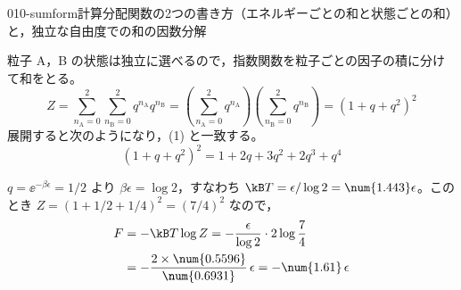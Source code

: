 \documentclass[uplatex,dvipdfmx,a4paper,11pt]{jsarticle}
\begin{document}
\begin{mondai}{010-sumform}{計算}{分配関数の2つの書き方（エネルギーごとの和と状態ごとの和）と，独立な自由度での和の因数分解}
\begin{tadashii}
 粒子 A，B の状態は独立に選べるので，指数関数を粒子ごとの因子の積に分けて和をとる。
\[Z=\sum_{n_{\mathrm{A}}=0}^{2}\sum_{n_{\mathrm{B}}=0}^{2}q^{n_{\mathrm{A}}}q^{n_{\mathrm{B}}}=\left(\sum_{n_{\mathrm{A}}=0}^{2}q^{n_{\mathrm{A}}}\right)\left(\sum_{n_{\mathrm{B}}=0}^{2}q^{n_{\mathrm{B}}}\right)=\left(1+q+q^{2}\right)^{2}\]
展開すると次のようになり，(1) と一致する。
\[\left(1+q+q^{2}\right)^{2}=1+2q+3q^{2}+2q^{3}+q^{4}\]

 $q=\ee^{-\beta\epsilon}=1/2$ より $\beta\epsilon=\log2$，すなわち $\kB T=\epsilon/\log2=\num{1.443}\epsilon$。このとき $Z=(1+1/2+1/4)^{2}=(7/4)^{2}$ なので，
\begin{align*}
F&=-\kB T\log Z=-\frac{\epsilon}{\log2}\cdot2\log\frac{7}{4}\\
&=-\frac{2\times\num{0.5596}}{\num{0.6931}}\,\epsilon=-\num{1.61}\,\epsilon
\end{align*}


\end{tadashii}
\end{mondai}
\end{document}
